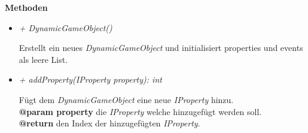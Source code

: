             \textbf{Methoden}
            \begin{itemize}
                \item \textit{+ DynamicGameObject()}
                    \begin{leftbar}[0.9\linewidth]
                        Erstellt ein neues \textit{DynamicGameObject} und initialisiert properties und events als leere List.
                    \end{leftbar}
                \item \textit{+ addProperty(IProperty property): int}
                    \begin{leftbar}[0.9\linewidth]
                        Fügt dem \textit{DynamicGameObject} eine neue \textit{IProperty} hinzu.\\
                        \textbf{@param property} die \textit{IProperty} welche hinzugefügt werden soll.\\
                        \textbf{@return} den Index der hinzugefügten \textit{IProperty}.
                    \end{leftbar}


\end{itemize}
